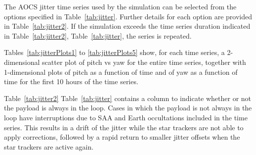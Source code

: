 \documentclass[11pt]{article}      %
\begin{document}
The AOCS jitter time series used by the simulation can be selected from the options specified in Table~\ref{tab:jitter}.
\ifpdf
Further details for each option are provided in Table~\ref{tab:jitter2}.
\fi
If the simulation exceeds the time series duration indicated in
\ifpdf
Table~\ref{tab:jitter2},
\else
Table~\ref{tab:jitter},
\fi
the series is repeated.

Tables~\ref{tab:jitterPlots1} to \ref{tab:jitterPlots5} show, for each time series, a 2-dimensional scatter plot of pitch vs yaw for the entire time series, together with 1-dimensional plots of pitch as a function of time and of yaw as a function of time for the first 10 hours of the time series.

\ifpdf
Table~\ref{tab:jitter2}
\else
Table~\ref{tab:jitter}
\fi
contains a column to indicate whether or not the payload is always in the loop. Cases in which the payload is not always in the loop have interruptions due to SAA and Earth occultations included in the time series. This results in a drift of the jitter while the star trackers are not able to apply corrections, followed by a rapid return to smaller jitter offsets when the star trackers are active again.
\end{document}
